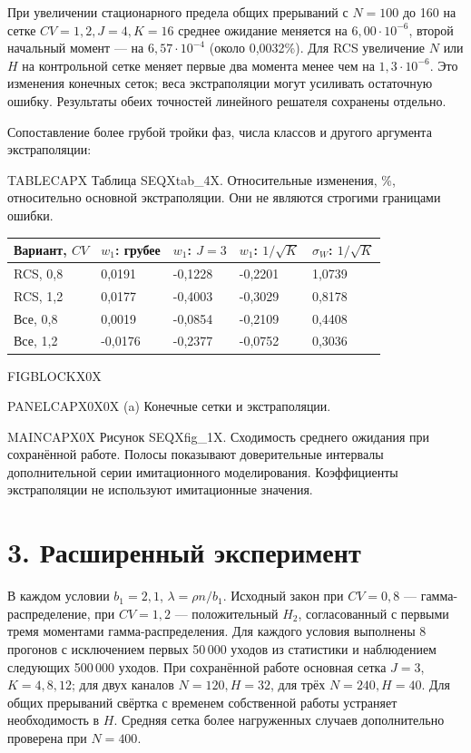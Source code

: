 При увеличении стационарного предела общих прерываний с \(N=100\) до 160 на сетке \(CV=1{,}2,J=4,K=16\) среднее ожидание меняется на \(6{,}00\cdot10^{-6}\), второй начальный момент --- на \(6{,}57\cdot10^{-4}\) (около 0{,}0032\%). Для RCS увеличение \(N\) или \(H\) на контрольной сетке меняет первые два момента менее чем на \(1{,}3\cdot10^{-6}\). Это изменения конечных сеток; веса экстраполяции могут усиливать остаточную ошибку. Результаты обеих точностей линейного решателя сохранены отдельно.

Сопоставление более грубой тройки фаз, числа классов и другого аргумента экстраполяции:

\noindent TABLECAPX Таблица SEQXtab_4X. Относительные изменения, \%, относительно основной экстраполяции. Они не являются строгими границами ошибки.\par

\setlength{\tabcolsep}{2pt}
\begin{tabular}{p{4.44cm}p{2.79cm}p{2.79cm}p{2.79cm}p{2.79cm}}
\toprule
Вариант, $CV$ & $w_1$: грубее & $w_1$: $J=3$ & $w_1$: $1/\sqrt K$ & $\sigma_W$: $1/\sqrt K$ \\
\midrule
RCS, 0,8 & 0,0191 & -0,1228 & -0,2201 & 1,0739 \\
RCS, 1,2 & 0,0177 & -0,4003 & -0,3029 & 0,8178 \\
Все, 0,8 & 0,0019 & -0,0854 & -0,2109 & 0,4408 \\
Все, 1,2 & -0,0176 & -0,2377 & -0,0752 & 0,3036 \\
\bottomrule
\end{tabular}




\noindent FIGBLOCKX0X\par

\noindent PANELCAPX0X0X (a) Конечные сетки и экстраполяции.\par

\noindent MAINCAPX0X Рисунок SEQXfig_1X. Сходимость среднего ожидания при сохранённой работе. Полосы показывают доверительные интервалы дополнительной серии имитационного моделирования. Коэффициенты экстраполяции не используют имитационные значения.\par
\section*{3. Расширенный эксперимент}
В каждом условии \(b_1=2{,}1\), \(\lambda=\rho n/b_1\). Исходный закон при \(CV=0{,}8\) --- гамма-распределение, при \(CV=1{,}2\) --- положительный \(H_2\), согласованный с первыми тремя моментами гамма-распределения. Для каждого условия выполнены 8 прогонов с исключением первых 50\,000 уходов из статистики и наблюдением следующих 500\,000 уходов. При сохранённой работе основная сетка \(J=3\), \(K=4,8,12\); для двух каналов \(N=120,H=32\), для трёх \(N=240,H=40\). Для общих прерываний свёртка с временем собственной работы устраняет необходимость в \(H\). Средняя сетка более нагруженных случаев дополнительно проверена при \(N=400\).

